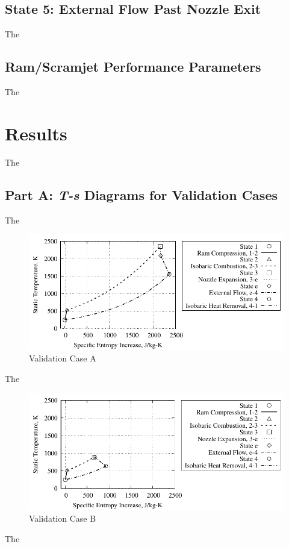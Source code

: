 \documentclass[conf]{new-aiaa} %
\begin{document}
\subsection{State 5: External Flow Past Nozzle Exit}
The

\subsection{Ram/Scramjet Performance Parameters}
The


\section{Results}
The

\subsection{Part A: \textit{T-s} Diagrams for Validation Cases}
The

\begin{figure}[hbt!]
\centering
\includegraphics[]{media/ts_plot_files/TS_plot_for_case_7.pdf}
\caption{\label{fig:partavalida} Validation Case A}
\end{figure}
The

\begin{figure}[hbt!]
\centering
\includegraphics[]{media/ts_plot_files/TS_plot_for_case_8.pdf}
\caption{\label{fig:partavalidb} Validation Case B}
\end{figure}
The
\end{document}
